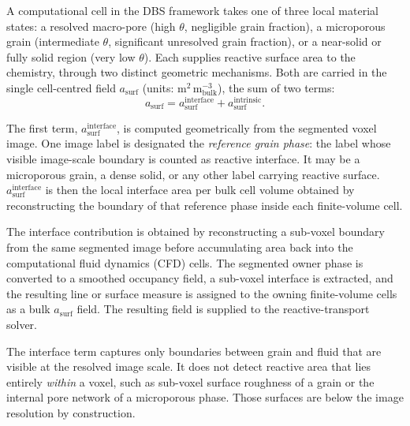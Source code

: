 A computational cell in the DBS framework takes one of three local material
states: a resolved macro-pore (high $\theta$, negligible grain fraction), a
microporous grain (intermediate $\theta$, significant unresolved grain
fraction), or a near-solid or fully solid region (very low $\theta$). Each
supplies reactive surface area to the chemistry, through two distinct geometric
mechanisms. Both are carried in the single cell-centred field
$a_{\mathrm{surf}}$ (units: m$^2\,\mathrm{m}^{-3}_{\mathrm{bulk}}$), the sum of
two terms:
\begin{equation}
a_{\mathrm{surf}} = a_{\mathrm{surf}}^{\mathrm{interface}} +
a_{\mathrm{surf}}^{\mathrm{intrinsic}}.
\label{eq:asurf}
\end{equation}

The first term, $a_{\mathrm{surf}}^{\mathrm{interface}}$, is computed
geometrically from the segmented voxel image. One image label is designated the
\emph{reference grain phase}: the label whose visible image-scale boundary is
counted as reactive interface. It may be a microporous grain, a dense solid, or
any other label carrying reactive surface.
$a_{\mathrm{surf}}^{\mathrm{interface}}$ is then the local interface area per
bulk cell volume obtained by reconstructing the boundary of that reference
phase inside each finite-volume cell.

The interface contribution is obtained by reconstructing a sub-voxel boundary from the
same segmented image before accumulating area back into the computational
fluid dynamics (CFD) cells. The segmented owner phase is converted to a smoothed
occupancy field, a sub-voxel interface is extracted, and the resulting line or
surface measure is assigned to the owning finite-volume cells as a bulk
$a_{\mathrm{surf}}$ field. The resulting field is supplied to the
reactive-transport solver.

The interface term captures only boundaries between grain and fluid that are
visible at the resolved image scale. It does not detect
reactive area that lies entirely \emph{within} a voxel, such as sub-voxel
surface roughness of a grain or the internal pore network of a microporous
phase. Those surfaces are below the image resolution by construction.

